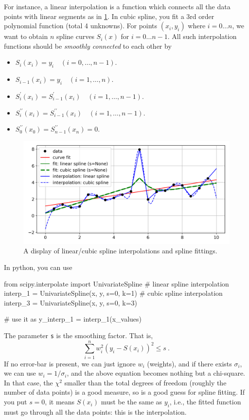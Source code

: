 For instance, a linear interpolation is a function which connects all the data points with linear segments as in \cref{fig:interpolation}. In cubic spline, you fit a 3rd order polynomial function (total 4 unknowns). For points $ (x_i, y_i) $ where $ i = 0 \ldots n $, we want to obtain $ n $ spline curves $ S_i(x) $ for $ i = 0 \ldots n-1 $. All such interpolation functions should be \textit{smoothly connected} to each other by
\begin{itemize}
  \item $ S_i (x_i ) = y_i      \quad(i = 0 , \ldots , n-1). $
  \item $ S_{i-1} (x_i ) = y_i  \quad(i = 1 , \ldots , n). $
  \item $ S^\prime_i (x_i) = S^\prime_{i-1} (x_i)\quad(i = 1 , \ldots , n-1). $
  \item $ S^{\prime\prime}_i (x_i) = S^{\prime\prime}_{i-1} (x_i) \quad(i = 1 , \ldots , n-1). $
  \item $ S^{\prime\prime}_0 (x_0) = S^{\prime\prime}_{n-1} (x_n) =0 $.
\end{itemize}

\begin{figure}
  \centering
  \includegraphics[width=0.7\linewidth]{figs/interpolation}
  \caption{A display of linear/cubic spline interpolations and spline fittings.}
  \label{fig:interpolation}
\end{figure}

In python, you can use
\begin{python}
from scipy.interpolate import UnivariateSpline
# linear spline interpolation
interp_1 = UnivariateSpline(x, y, s=0, k=1)
# cubic spline interpolation
interp_3 = UnivariateSpline(x, y, s=0, k=3)

# use it as y_interp_1 = interp_1(x_values)
\end{python}
The parameter \texttt{s} is the smoothing factor. That is, 
\begin{equation}
  \sum_{i=1}^{n} w_i^2 (y_i - S(x_i))^2 \le s ~.
\end{equation}
If no error-bar is present, we can just ignore $ w_i $ (weights), and if there exists $ \sigma_i $, we can use $ w_i = 1/\sigma_i $, and the above equation becomes nothing but a chi-square. In that case, the $ \chi^2 $ smaller than the total degrees of freedom (roughly the number of data points) is a good measure, so  is a good guess for spline fitting. If you put $ s = 0 $, it means $ S(x_i) $ must be the same as $ y_i $, i.e., the fitted function must go through all the data points: this is the interpolation. 

